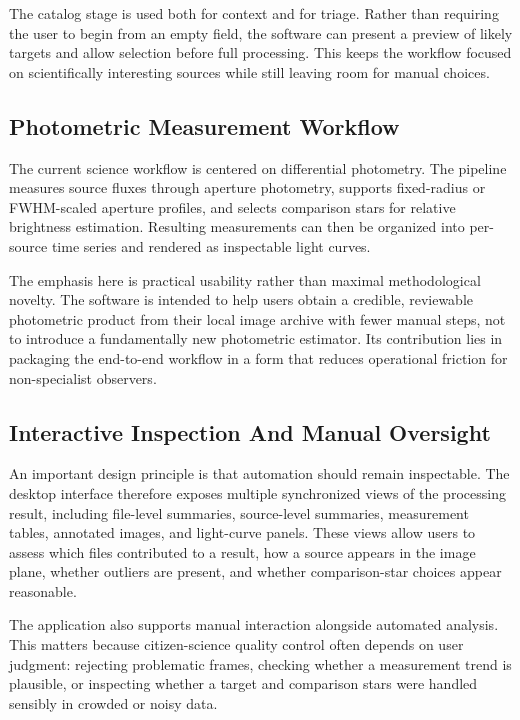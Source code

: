 \documentclass[modern]{aastex701}
\begin{document}
The catalog stage is used both for context and for triage. Rather than requiring the user to begin from an empty field, the software can present a preview of likely targets and allow selection before full processing. This keeps the workflow focused on scientifically interesting sources while still leaving room for manual choices.

\subsection{Photometric Measurement Workflow}\label{subsec:photometry}

The current science workflow is centered on differential photometry. The pipeline measures source fluxes through aperture photometry, supports fixed-radius or FWHM-scaled aperture profiles, and selects comparison stars for relative brightness estimation. Resulting measurements can then be organized into per-source time series and rendered as inspectable light curves.

The emphasis here is practical usability rather than maximal methodological novelty. The software is intended to help users obtain a credible, reviewable photometric product from their local image archive with fewer manual steps, not to introduce a fundamentally new photometric estimator. Its contribution lies in packaging the end-to-end workflow in a form that reduces operational friction for non-specialist observers.

\subsection{Interactive Inspection And Manual Oversight}\label{subsec:inspection}

An important design principle is that automation should remain inspectable. The desktop interface therefore exposes multiple synchronized views of the processing result, including file-level summaries, source-level summaries, measurement tables, annotated images, and light-curve panels. These views allow users to assess which files contributed to a result, how a source appears in the image plane, whether outliers are present, and whether comparison-star choices appear reasonable.

The application also supports manual interaction alongside automated analysis. This matters because citizen-science quality control often depends on user judgment: rejecting problematic frames, checking whether a measurement trend is plausible, or inspecting whether a target and comparison stars were handled sensibly in crowded or noisy data.
\end{document}
